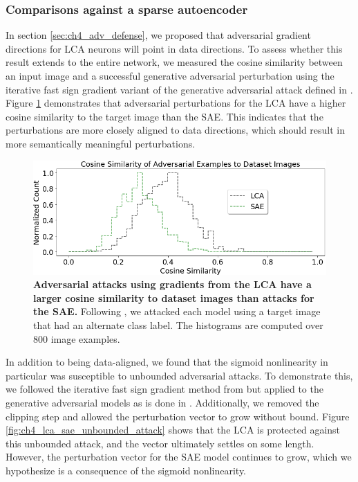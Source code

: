 \subsubsection{Comparisons against a sparse autoencoder}
In section \ref{sec:ch4_adv_defense}, we proposed that adversarial gradient directions for LCA neurons will point in data directions. To assess whether this result extends to the entire network, we measured the cosine similarity between an input image and a successful generative adversarial perturbation using the iterative fast sign gradient \parencite{kurakin2016adversarial} variant of the generative adversarial attack defined in \parencite{kos2018adversarial}. Figure \ref{fig:ch4_cosine_similarity} demonstrates that adversarial perturbations for the LCA have a higher cosine similarity to the target image than the SAE. This indicates that the perturbations are more closely aligned to data directions, which should result in more semantically meaningful perturbations.

\begin{figure}[h]
    \begin{center}
    \centerline{\includegraphics[width=\columnwidth]{figures/cosyne_similarity.png}}
    \end{center}
    \caption{\textbf{Adversarial attacks using gradients from the LCA have a larger cosine similarity to dataset images than attacks for the SAE.} Following \parencite{kos2018adversarial, kurakin2016adversarial}, we attacked each model using a target image that had an alternate class label. The histograms are computed over 800 image examples.}
    \label{fig:ch4_cosine_similarity}
\end{figure}

In addition to being data-aligned, we found that the sigmoid nonlinearity in particular was susceptible to unbounded adversarial attacks. To demonstrate this, we followed the iterative fast sign gradient method from \parencite{kurakin2016adversarial} but applied to the generative adversarial models as is done in \parencite{kos2018adversarial}. Additionally, we removed the clipping step and allowed the perturbation vector to grow without bound. Figure \ref{fig:ch4_lca_sae_unbounded_attack} shows that the LCA is protected against this unbounded attack, and the vector ultimately settles on some length. However, the perturbation vector for the SAE model continues to grow, which we hypothesize is a consequence of the sigmoid nonlinearity.

